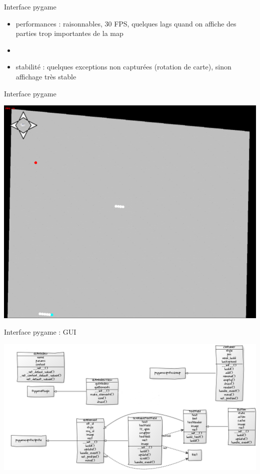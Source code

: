 \documentclass[11pt]{beamer}
\begin{document}
\begin{frame}{Interface pygame}
	\begin{itemize}
    \item performances : raisonnables, 30 FPS, quelques lags quand on affiche des parties trop importantes de la map
		\item[]
    \item stabilité : quelques exceptions non capturées (rotation de carte), sinon affichage très stable
	\end{itemize}
\end{frame}

\begin{frame}{Interface pygame}
	\begin{center}\includegraphics[scale=0.2]{game_screenshot.png}\end{center}
\end{frame}

\begin{frame}{Interface pygame : GUI}
	\begin{center}\includegraphics[scale=0.25]{gui_uml.png}\end{center}
\end{frame}
\end{document}
